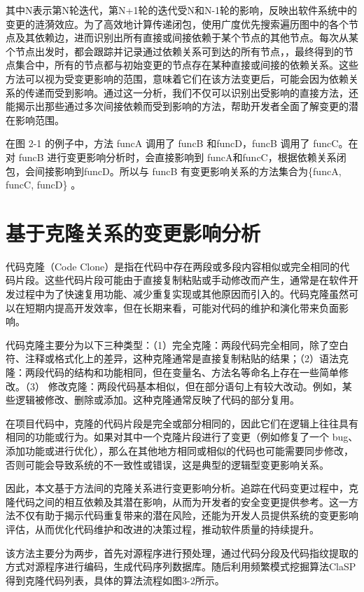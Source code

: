 其中N表示第N轮迭代，第N+1轮的迭代受N和N-1轮的影响，反映出软件系统中的变更的涟漪效应。为了高效地计算传递闭包，使用广度优先搜索遍历图中的各个节点及其依赖边，进而识别出所有直接或间接依赖于某个节点的其他节点。每次从某个节点出发时，都会跟踪并记录通过依赖关系可到达的所有节点，，最终得到的节点集合中，所有的节点都与初始变更的节点存在某种直接或间接的依赖关系。这些方法可以视为受变更影响的范围，意味着它们在该方法变更后，可能会因为依赖关系的传递而受到影响。通过这一分析，我们不仅可以识别出受影响的直接方法，还能揭示出那些通过多次间接依赖而受到影响的方法，帮助开发者全面了解变更的潜在影响范围。


在图 2-1 的例子中，方法 funcA 调用了 funcB 和funcD，funcB 调用了 funcC。在对 funcB 进行变更影响分析时，会直接影响到 funcA和funcC，根据依赖关系闭包，会间接影响到funcD。所以与 funcB 有变更影响关系的方法集合为\{funcA, funcC, funcD\} 。


\section{基于克隆关系的变更影响分析}
代码克隆（Code Clone）是指在代码中存在两段或多段内容相似或完全相同的代码片段。这些代码片段可能由于直接复制粘贴或手动修改而产生，通常是在软件开发过程中为了快速复用功能、减少重复实现或其他原因而引入的。代码克隆虽然可以在短期内提高开发效率，但在长期来看，可能对代码的维护和演化带来负面影响。

代码克隆主要分为以下三种类型：（1）完全克隆：两段代码完全相同，除了空白符、注释或格式化上的差异，这种克隆通常是直接复制粘贴的结果；（2）语法克隆：两段代码的结构和功能相同，但在变量名、方法名等命名上存在一些简单修改。（3） 修改克隆：两段代码基本相似，但在部分语句上有较大改动。例如，某些逻辑被修改、删除或添加。这种克隆通常反映了代码的部分复用。

在项目代码中，克隆的代码片段是完全或部分相同的，因此它们在逻辑上往往具有相同的功能或行为。如果对其中一个克隆片段进行了变更（例如修复了一个 bug、添加功能或进行优化），那么在其他地方相同或相似的代码也可能需要同步修改，否则可能会导致系统的不一致性或错误，这是典型的逻辑型变更影响关系。

因此，本文基于方法间的克隆关系进行变更影响分析。追踪在代码变更过程中，克隆代码之间的相互依赖及其潜在影响，从而为开发者的安全变更提供参考。这一方法不仅有助于揭示代码重复带来的潜在风险，还能为开发人员提供系统的变更影响评估，从而优化代码维护和改进的决策过程，推动软件质量的持续提升。

该方法主要分为两步，首先对源程序进行预处理，通过代码分段及代码指纹提取的方式对源程序进行编码，生成代码序列数据库。随后利用频繁模式挖掘算法ClaSP得到克隆代码列表，具体的算法流程如图3-2所示。

